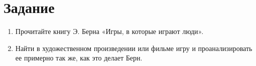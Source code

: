 \section{Задание}

\begin{enumerate}
    \item Прочитайте книгу Э. Берна «Игры, в которые играют люди». 
    \item Найти в художественном произведении или фильме игру и проанализировать ее примерно так же, как это делает Берн.
\end{enumerate}
